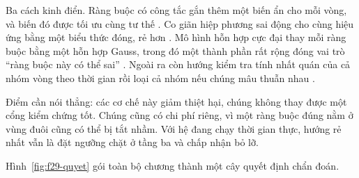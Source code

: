 \documentclass[../../deep_learning.tex]{subfiles}
\begin{document}
Ba cách kinh điển. Ràng buộc có công tắc gắn thêm một biến ẩn cho mỗi vòng, và biến đó được tối ưu cùng tư thế \cite{f29sunderhauf2012switchable}. Co giãn hiệp phương sai động cho cùng hiệu ứng bằng một biểu thức đóng, rẻ hơn \cite{f29agarwal2013robust}. Mô hình hỗn hợp cực đại thay mỗi ràng buộc bằng một hỗn hợp Gauss, trong đó một thành phần rất rộng đóng vai trò ``ràng buộc này có thể sai'' \cite{f29olson2013inference}. Ngoài ra còn hướng kiểm tra tính nhất quán của cả nhóm vòng theo thời gian rồi loại cả nhóm nếu chúng mâu thuẫn nhau \cite{f29latif2013robust}.

Điểm cần nói thẳng: các cơ chế này giảm thiệt hại, chúng không thay được một cổng kiểm chứng tốt. Chúng cũng có chi phí riêng, vì một ràng buộc đúng nằm ở vùng đuôi cũng có thể bị tắt nhầm. Với hệ đang chạy thời gian thực, hướng rẻ nhất vẫn là đặt ngưỡng chặt ở tầng ba và chấp nhận bỏ lỡ.

Hình~\ref{fig:f29-quyet} gói toàn bộ chương thành một cây quyết định chẩn đoán.
\end{document}
